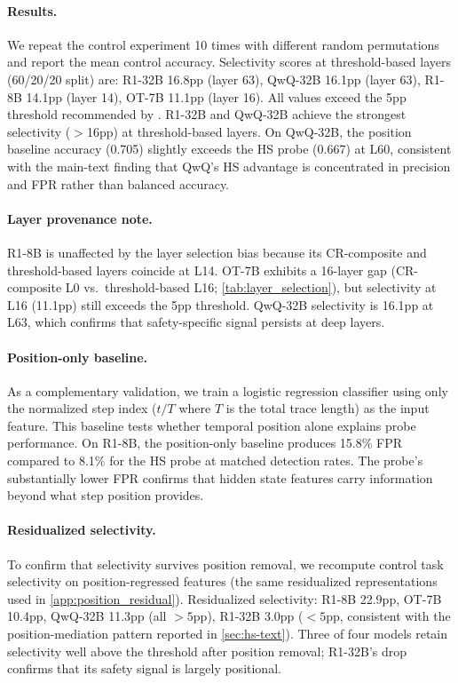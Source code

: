\paragraph{Results.} We repeat the control experiment 10 times with different random permutations and report the mean control accuracy. Selectivity scores at threshold-based layers (60/20/20 split) are: R1-32B 16.8pp (layer 63), QwQ-32B 16.1pp (layer 63), R1-8B 14.1pp (layer 14), OT-7B 11.1pp (layer 16). All values exceed the 5pp threshold recommended by \cite{hewitt2019control}. R1-32B and QwQ-32B achieve the strongest selectivity ($>$16pp) at threshold-based layers. On QwQ-32B, the position baseline accuracy (0.705) slightly exceeds the HS probe (0.667) at L60, consistent with the main-text finding that QwQ's HS advantage is concentrated in precision and FPR rather than balanced accuracy.

\paragraph{Layer provenance note.} R1-8B is unaffected by the layer selection bias because its CR-composite and threshold-based layers coincide at L14. OT-7B exhibits a 16-layer gap (CR-composite L0 vs.\ threshold-based L16; \cref{tab:layer_selection}), but selectivity at L16 (11.1pp) still exceeds the 5pp threshold. QwQ-32B selectivity is 16.1pp at L63, which confirms that safety-specific signal persists at deep layers.

\paragraph{Position-only baseline.} As a complementary validation, we train a logistic regression classifier using only the normalized step index ($t / T$ where $T$ is the total trace length) as the input feature. This baseline tests whether temporal position alone explains probe performance. On R1-8B, the position-only baseline produces 15.8\% FPR compared to 8.1\% for the HS probe at matched detection rates. The probe's substantially lower FPR confirms that hidden state features carry information beyond what step position provides.

\paragraph{Residualized selectivity.} To confirm that selectivity survives position removal, we recompute control task selectivity on position-regressed features (the same residualized representations used in \cref{app:position_residual}). Residualized selectivity: R1-8B 22.9pp, OT-7B 10.4pp, QwQ-32B 11.3pp (all ${>}5$pp), R1-32B 3.0pp (${<}5$pp, consistent with the position-mediation pattern reported in \cref{sec:hs-text}). Three of four models retain selectivity well above the \citet{hewitt2019control} threshold after position removal; R1-32B's drop confirms that its safety signal is largely positional.


